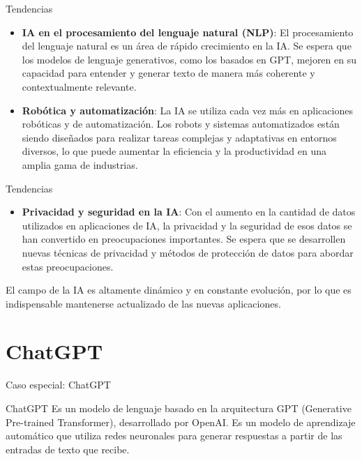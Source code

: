 \documentclass[11pt,aspectratio=169]{beamer}
\begin{document}
\begin{frame}{Tendencias}
	\begin{itemize}
		\item \textbf{IA en el procesamiento del lenguaje natural (NLP)}: El procesamiento del lenguaje natural es un área de rápido 
			crecimiento en la IA. Se espera que los modelos de lenguaje generativos, como los basados en GPT, mejoren en su capacidad 
			para entender y generar texto de manera más coherente y contextualmente relevante.\pause
		\item \textbf{Robótica y automatización}: La IA se utiliza cada vez más en aplicaciones robóticas y de automatización. 
			Los robots y sistemas automatizados están siendo diseñados para realizar tareas complejas y adaptativas en entornos 
			diversos, lo que puede aumentar la eficiencia y la productividad en una amplia gama de industrias.
	\end{itemize}
\end{frame}

\begin{frame}{Tendencias}
	\begin{itemize}
		\item \textbf{Privacidad y seguridad en la IA}: Con el aumento en la cantidad de datos utilizados en aplicaciones de IA, 
			la privacidad y la seguridad de esos datos se han convertido en preocupaciones importantes. Se espera que se desarrollen 
			nuevas técnicas de privacidad y métodos de protección de datos para abordar estas preocupaciones.\pause
	\end{itemize}
	El campo de la IA es altamente dinámico y en constante evolución, por lo que es indispensable mantenerse actualizado de las nuevas
	aplicaciones.
\end{frame}

\section{ChatGPT}
\begin{frame}{Caso especial: ChatGPT}
	\begin{block}{ChatGPT}
		Es un modelo de lenguaje basado en la arquitectura GPT (Generative Pre-trained Transformer), desarrollado por 
		OpenAI\footnotemark. Es un 
		modelo de aprendizaje automático que utiliza redes neuronales para generar respuestas a partir de las entradas de texto que recibe.	
	\end{block}
\end{frame}
\end{document}
